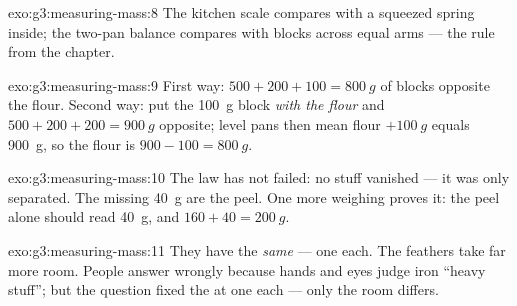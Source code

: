 \begin{solution}{exo:g3:measuring-mass:8}
The kitchen scale compares with a squeezed spring inside; the
two-pan balance compares with blocks across equal arms --- the
 rule from the  chapter.
\end{solution}

\begin{solution}{exo:g3:measuring-mass:9}
First way: $500 + 200 + 100 = \qty{800}{g}$ of blocks opposite the
flour. Second way: put the \qty{100}{g} block \emph{with the flour}
and $500 + 200 + 200 = \qty{900}{g}$ opposite; level pans then mean
flour $+ \qty{100}{g}$ equals \qty{900}{g}, so the flour is
$900 - 100 = \qty{800}{g}$.
\end{solution}

\begin{solution}{exo:g3:measuring-mass:10}
The law has not failed: no stuff vanished --- it was only
separated. The missing \qty{40}{g} are the peel. One more weighing
proves it: the peel alone should read \qty{40}{g}, and $160 + 40 =
\qty{200}{g}$.
\end{solution}

\begin{solution}{exo:g3:measuring-mass:11}
They have the \emph{same}  --- one  each. The feathers
take far more room. People answer wrongly because hands and eyes
judge iron ``heavy stuff''; but the question fixed the  at one
 each --- only the room differs.
\end{solution}
